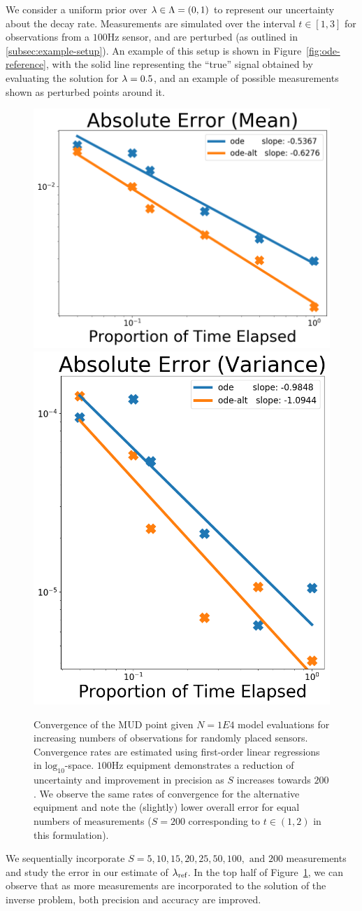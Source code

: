 We consider a uniform prior over $\lambda \in \Lambda = (0, 1)$ to represent our uncertainty about the decay rate.
Measurements are simulated over the interval $t \in [1,3]$ for observations from a $100$Hz sensor, and are perturbed (as outlined in \ref{subsec:example-setup}).
An example of this setup is shown in Figure~\ref{fig:ode-reference}, with the solid line representing the ``true'' signal obtained by evaluating the solution for $\lambda = 0.5$, and an example of possible measurements shown as perturbed points around it.


\begin{figure}[htbp]
  \centering
  \includegraphics[width=0.475\linewidth]{figures/ode/ode_convergence_mud_obs_mean}
  \includegraphics[width=0.475\linewidth]{figures/ode/ode_convergence_mud_obs_var}

  \caption{Convergence of the MUD point given $N=1E4$ model evaluations for increasing numbers of observations for randomly placed sensors.
  Convergence rates are estimated using first-order linear regressions in $\text{log}_{10}$-space.
  $100$Hz equipment demonstrates a reduction of uncertainty and improvement in precision as $S$ increases towards $200$.
  We observe the same rates of convergence for the alternative equipment and note the (slightly) lower overall error for equal numbers of measurements ($S=200$ corresponding to $t\in (1,2)$ in this formulation).
  }
  \label{fig:ode-convergence-obs}
\end{figure}
We sequentially incorporate $S=5, 10, 15, 20, 25, 50, 100, \text{ and } 200$ measurements and study the error in our estimate of $\lambda_\text{ref}$.
In the top half of Figure~\ref{fig:ode-convergence-obs}, we can observe that as more measurements are incorporated to the solution of the inverse problem, both precision and accuracy are improved.



